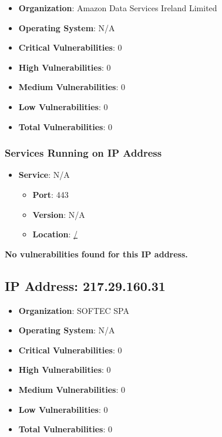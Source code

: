 \documentclass{article}
\begin{document}
\begin{itemize}
    \item \textbf{Organization}: Amazon Data Services Ireland Limited
    \item \textbf{Operating System}:  N/A 
    \item \textbf{Critical Vulnerabilities}: 0
    \item \textbf{High Vulnerabilities}: 0
    \item \textbf{Medium Vulnerabilities}: 0
    \item \textbf{Low Vulnerabilities}: 0
    \item \textbf{Total Vulnerabilities}: 0
\end{itemize}

\subsubsection*{Services Running on IP Address}

\begin{itemize}
    
        \item \textbf{Service}: N/A
        \begin{itemize}
            \item \textbf{Port}: 443
            \item \textbf{Version}:  N/A 
            \item \textbf{Location}: \href{ / }{ / }
        \end{itemize}
    
\end{itemize}


\textbf{No vulnerabilities found for this IP address.}




\clearpage



\subsection*{IP Address: 217.29.160.31}

\begin{itemize}
    \item \textbf{Organization}: SOFTEC SPA
    \item \textbf{Operating System}:  N/A 
    \item \textbf{Critical Vulnerabilities}: 0
    \item \textbf{High Vulnerabilities}: 0
    \item \textbf{Medium Vulnerabilities}: 0
    \item \textbf{Low Vulnerabilities}: 0
    \item \textbf{Total Vulnerabilities}: 0
\end{itemize}
\end{document}

